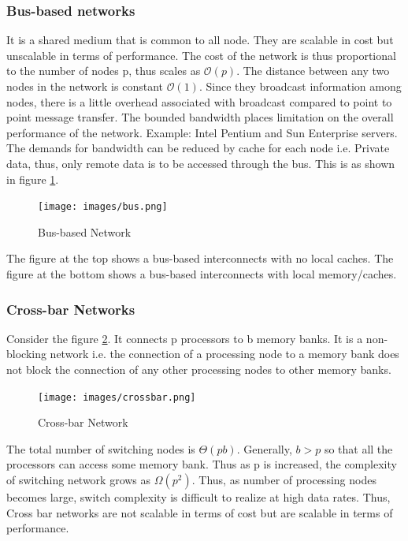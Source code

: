 \documentclass[12pt]{article}
\begin{document}
\subsubsection{Bus-based networks}
It is a shared medium that is common to all node. They are scalable in cost but unscalable in terms of performance.
The cost of the network is thus proportional to the number of nodes p, thus scales as $\mathcal{O}(p)$. The distance between any two nodes in the network is constant $\mathcal{O}(1)$.
Since they broadcast information among nodes, there is a little overhead associated with broadcast compared to point to point message transfer.
The bounded bandwidth places limitation on the overall performance of the network. Example: Intel Pentium and Sun Enterprise servers. The demands for bandwidth can be reduced by cache for
each node i.e. Private data, thus, only remote data is to be accessed through the bus.
This is as shown in figure \ref{fig:bus}.
\begin{figure}[H]
    \centering
    \texttt{[image: images/bus.png]}
    \caption{Bus-based Network}
    \label{fig:bus}
\end{figure}
The figure at the top shows a bus-based interconnects with no local caches.
The figure at the bottom shows a bus-based interconnects with local memory/caches.

\subsubsection{Cross-bar Networks}
Consider the figure \ref{fig:crossbar}. It connects p processors to b memory banks.
It is a non-blocking network i.e. the connection of a processing node to a memory bank does not block the connection
of any other processing nodes to other memory banks. 
\begin{figure}[H]
    \centering
    \texttt{[image: images/crossbar.png]}
    \caption{Cross-bar Network}
    \label{fig:crossbar}
\end{figure}
The total number of switching nodes is $\Theta(pb)$. Generally, $b>p$ so that 
all the processors can access some memory bank. Thus as p is increased, the complexity of switching network 
grows as $\Omega(p^2)$. Thus, as number of processing nodes becomes large, switch complexity is difficult to realize
at high data rates. Thus, Cross bar networks are not scalable in terms of cost but are scalable in terms of performance.
\end{document}
